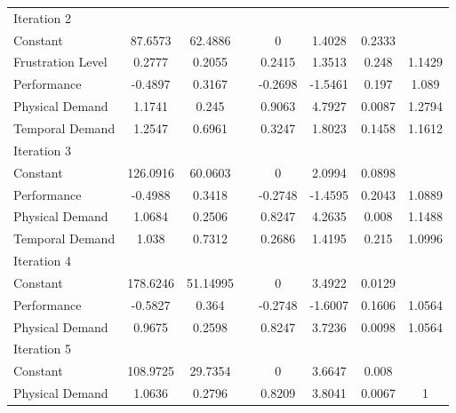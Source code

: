 \documentclass[thesis]{fputhesis}
\begin{document}
\begin{body}
\begin{table}[h!]
{\begin{tabular}{@{}l *{2}{S[table-format=2.4]} c *{4}{S[table-format=1.4]} @{}}
                Iteration 2 \\
                Constant            &  87.6573      &  62.4886      &&   0      &   1.4028  &   0.2333  &           \\
                Frustration Level   &   0.2777      &   0.2055      &&   0.2415 &   1.3513  &   0.248   &    1.1429 \\ Performance         &  -0.4897      &   0.3167      &&  -0.2698 &  -1.5461  &   0.197   &    1.089  \\
                Physical Demand     &   1.1741      &   0.245       &&   0.9063 &   4.7927  &   0.0087  &    1.2794 \\
                Temporal Demand     &   1.2547      &   0.6961      &&   0.3247 &   1.8023  &   0.1458  &    1.1612 \\
                Iteration 3 \\
                Constant            & 126.0916      &  60.0603      &&  0      &   2.0994  &   0.0898  &           \\
                Performance         &  -0.4988      &   0.3418      && -0.2748 &  -1.4595  &   0.2043  &    1.0889 \\
                Physical Demand     &   1.0684      &   0.2506      &&   0.8247 &   4.2635  &   0.008   &    1.1488 \\
                Temporal Demand     &   1.038       &   0.7312      &&   0.2686 &   1.4195  &   0.215   &    1.0996 \\
                Iteration 4 \\
                Constant            & 178.6246      &  51.14995     &&   0      &   3.4922  &   0.0129  &           \\
                Performance         &  -0.5827      &   0.364       &&  -0.2748 &  -1.6007  &   0.1606  &    1.0564 \\
                Physical Demand     &   0.9675      &   0.2598      &&   0.8247 &   3.7236  &   0.0098  &    1.0564 \\
                Iteration 5 \\
                Constant            & 108.9725      &  29.7354      &&   0      &   3.6647  &   0.008   &           \\
                Physical Demand     &   1.0636      &   0.2796      &&   0.8209 &   3.8041  &   0.0067  &    1      \\
            \bottomrule    
        \end{tabular}%
    }
\end{table}
\pagebreak

\end{body}
\end{document}
